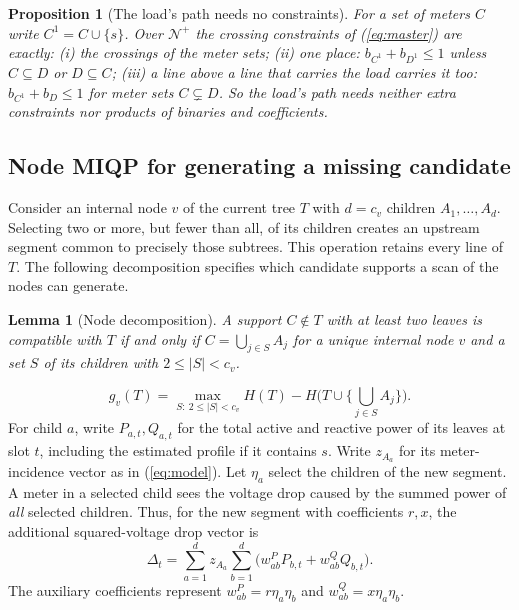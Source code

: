 \documentclass[journal,onecolumn,11pt]{IEEEtran}
\newtheorem{lemma}{Lemma}
\newtheorem{proposition}{Proposition}
\newcommand{\Nset}{\mathcal{N}}
\begin{document}
\begin{proposition}[The load's path needs no constraints]\label{prop:path}
For a set of meters $C$ write $C^1=C\cup\{s\}$. Over $\Nset^+$ the crossing constraints of (\ref{eq:master}) are exactly:
(i) the crossings of the meter sets; (ii) one place: $b_{C^1}+b_{D^1}\le1$ unless $C\subseteq D$ or $D\subseteq C$; (iii) a
line above a line that carries the load carries it too: $b_{C^1}+b_D\le1$ for meter sets $C\subsetneq D$. So the load's path
needs neither extra constraints nor products of binaries and coefficients.
\end{proposition}

\subsection{Node MIQP for generating a missing candidate}\label{sec:node}
Consider an internal node $v$ of the current tree $T$ with $d=c_v$ children $A_1,\dots,A_d$.
Selecting two or more, but fewer than all, of its children creates an upstream segment common to precisely those
subtrees. This operation retains every line of $T$. The following decomposition specifies which candidate
supports a scan of the nodes can generate.
\begin{lemma}[Node decomposition]\label{lem:node}
A support $C\notin T$ with at least two leaves is compatible with $T$ if and only if $C=\bigcup_{j\in S}A_j$ for a unique
internal node $v$ and a set $S$ of its children with $2\le|S|<c_v$.
\end{lemma}
\begin{equation}\label{eq:price}
g_v(T)=\max_{S:\ 2\le|S|<c_v}H(T)-H\Big(T\cup\Big\{\textstyle\bigcup_{j\in S}A_j\Big\}\Big).
\end{equation}
For child $a$, write $P_{a,t},Q_{a,t}$ for the total active and reactive power of its leaves at slot $t$,
including the estimated profile if it contains $s$. Write $z_{A_a}$ for its meter-incidence vector as in
(\ref{eq:model}). Let $\eta_a$ select the children of the new segment. A meter in a selected child sees the
voltage drop caused by the summed power of \emph{all} selected children. Thus, for the new segment with
coefficients $r,x$, the additional squared-voltage drop vector is
\begin{equation}\label{eq:node-drop}
\Delta_t=\sum_{a=1}^d z_{A_a}\sum_{b=1}^d
           \bigl(w^P_{ab}P_{b,t}+w^Q_{ab}Q_{b,t}\bigr).
\end{equation}
The auxiliary coefficients represent $w^P_{ab}=r\eta_a\eta_b$ and $w^Q_{ab}=x\eta_a\eta_b$.
\end{document}
